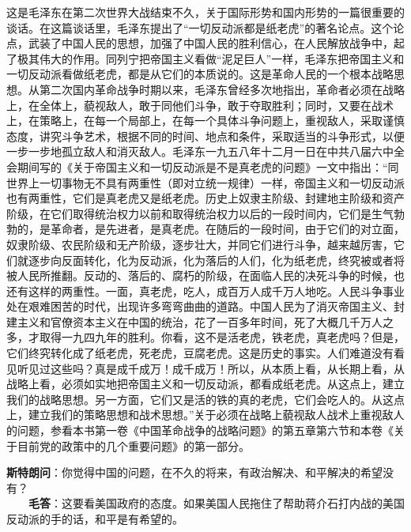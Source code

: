 \documentclass[cn,11pt,chinese]{elegantbook}
\begin{document}
\begin{introduction}\item  这是毛泽东在第二次世界大战结束不久，关于国际形势和国内形势的一篇很重要的谈话。在这篇谈话里，毛泽东提出了“一切反动派都是纸老虎”的著名论点。这个论点，武装了中国人民的思想，加强了中国人民的胜利信心，在人民解放战争中，起了极其伟大的作用。同列宁把帝国主义看做“泥足巨人”一样，毛泽东把帝国主义和一切反动派看做纸老虎，都是从它们的本质说的。这是革命人民的一个根本战略思想。从第二次国内革命战争时期以来，毛泽东曾经多次地指出，革命者必须在战略上，在全体上，藐视敌人，敢于同他们斗争，敢于夺取胜利；同时，又要在战术上，在策略上，在每一个局部上，在每一个具体斗争问题上，重视敌人，采取谨慎态度，讲究斗争艺术，根据不同的时间、地点和条件，采取适当的斗争形式，以便一步一步地孤立敌人和消灭敌人。毛泽东一九五八年十二月一日在中共八届六中全会期间写的《关于帝国主义和一切反动派是不是真老虎的问题》一文中指出：“同世界上一切事物无不具有两重性（即对立统一规律）一样，帝国主义和一切反动派也有两重性，它们是真老虎又是纸老虎。历史上奴隶主阶级、封建地主阶级和资产阶级，在它们取得统治权力以前和取得统治权力以后的一段时间内，它们是生气勃勃的，是革命者，是先进者，是真老虎。在随后的一段时间，由于它们的对立面，奴隶阶级、农民阶级和无产阶级，逐步壮大，并同它们进行斗争，越来越厉害，它们就逐步向反面转化，化为反动派，化为落后的人们，化为纸老虎，终究被或者将被人民所推翻。反动的、落后的、腐朽的阶级，在面临人民的决死斗争的时候，也还有这样的两重性。一面，真老虎，吃人，成百万人成千万人地吃。人民斗争事业处在艰难困苦的时代，出现许多弯弯曲曲的道路。中国人民为了消灭帝国主义、封建主义和官僚资本主义在中国的统治，花了一百多年时间，死了大概几千万人之多，才取得一九四九年的胜利。你看，这不是活老虎，铁老虎，真老虎吗？但是，它们终究转化成了纸老虎，死老虎，豆腐老虎。这是历史的事实。人们难道没有看见听见过这些吗？真是成千成万！成千成万！所以，从本质上看，从长期上看，从战略上看，必须如实地把帝国主义和一切反动派，都看成纸老虎。从这点上，建立我们的战略思想。另一方面，它们又是活的铁的真的老虎，它们会吃人的。从这点上，建立我们的策略思想和战术思想。”关于必须在战略上藐视敌人战术上重视敌人的问题，参看本书第一卷《中国革命战争的战略问题》的第五章第六节和本卷《关于目前党的政策中的几个重要问题》的第一部分。\end{introduction}
\textbf{斯特朗问}：你觉得中国的问题，在不久的将来，有政治解决、和平解决的希望没有？\\
　　\textbf{毛答}：这要看美国政府的态度。如果美国人民拖住了帮助蒋介石打内战的美国反动派的手的话，和平是有希望的。\\
\end{document}
